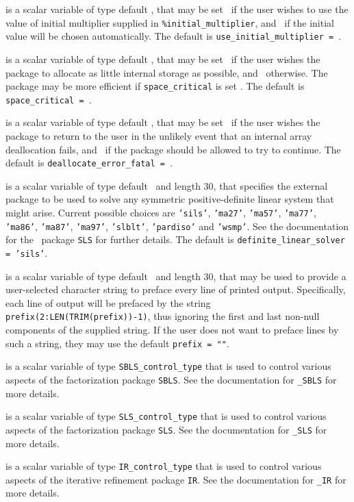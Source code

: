 \documentclass{galahad}
\begin{document}
\begin{description}
 is a scalar variable of type default \logical,
that may be set \true\ if the user wishes to use the value of initial
multiplier supplied in {\tt \%initial\_multiplier},
and \false\ if the initial value will be chosen automatically.
The default is {\tt use\_initial\_multiplier = \false}.

 is a scalar variable of type default \logical, that
may be set \true\ if the user wishes the package to allocate as little
internal storage as possible, and \false\ otherwise. The package may
be more efficient if {\tt space\_critical} is set \false.
The default is {\tt space\_critical = \false}.

 is a scalar variable of type default \logical,
that may be set \true\ if the user wishes the package to return to the user
in the unlikely event that an internal array deallocation fails,
and \false\ if the package should be allowed to try to continue.
The default is {\tt deallocate\_error\_fatal = \false}.

 is a scalar variable of type default \character\
and length 30, that specifies the external package to be used to
solve any symmetric positive-definite linear system that might arise.
Current possible
choices are {\tt 'sils'}, {\tt 'ma27'}, {\tt 'ma57'}, {\tt 'ma77'},
{\tt 'ma86'}, {\tt 'ma87'}, {\tt 'ma97'}, {\tt 'slblt'}, {\tt 'pardiso'}
and {\tt 'wsmp'}.
See the documentation for the \galahad\ package {\tt SLS} for further details.
The default is {\tt definite\_linear\_solver = 'sils'}.

 is a scalar variable of type default \character\
and length 30, that may be used to provide a user-selected
character string to preface every line of printed output.
Specifically, each line of output will be prefaced by the string
{\tt prefix(2:LEN(TRIM(prefix))-1)},
thus ignoring the first and last non-null components of the
supplied string. If the user does not want to preface lines by such
a string, they may use the default {\tt prefix = ""}.

 is a scalar variable of type
{\tt SBLS\_control\_type} that is used to control various aspects of the
factorization package {\tt SBLS}. See the documentation for
{\tt \libraryname\_SBLS} for more details.

 is a scalar variable of type
{\tt SLS\_control\_type} that is used to control various aspects of the
factorization package {\tt SLS}. See the documentation for
{\tt \libraryname\_SLS} for more details.

 is a scalar variable of type
{\tt IR\_control\_type} that is used to control various aspects of the
iterative refinement package {\tt IR}. See the documentation for
{\tt \libraryname\_IR} for more details.

\end{description}
\end{document}
